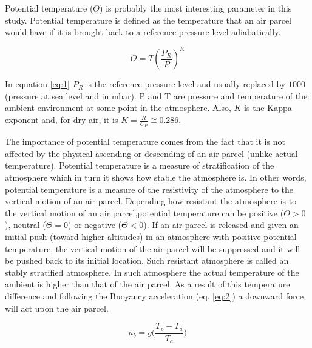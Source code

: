 \documentclass[a4paper,12pt]{article}
\numberwithin{equation}{section} %
\begin{document}
Potential temperature ($\Theta$) is probably the most interesting parameter in this study. Potential temperature is defined as the temperature that an air parcel would have if it is brought back to a reference pressure level adiabatically.

\vspace{0.5cm}

\begin{equation}\label{eq:1}
\Theta = T(\frac{P_R}{P})^K
\end{equation}

\vspace{0.5cm}

In equation \ref{eq:1} $P_R$ is the reference pressure level and usually replaced by $1000$ (pressure at sea level and in mbar). P and T are pressure and temperature of the ambient environment at some point in the atmosphere. Also, $K$ is the Kappa exponent and, for dry air, it is $K = \frac{R}{C_P}\cong 0.286$.

The importance of potential temperature comes from the fact that it is not affected by the physical ascending or descending of an air parcel (unlike actual temperature). Potential temperature is a measure of stratification of the atmosphere which in turn it shows how stable the atmosphere is. In other words, potential temperature is a measure of the resistivity of the atmosphere to the vertical motion of an air parcel. Depending how resistant the atmosphere is to the vertical motion of an air parcel,potential temperature can be positive ($\Theta > 0$), neutral ($\Theta = 0$) or negative ($\Theta < 0$). If an air parcel is released and given an initial push (toward higher altitudes) in an atmosphere with positive potential temperature, the vertical motion of the air parcel will be suppressed and it will be pushed back to its initial location. Such resistant atmosphere is called an stably stratified atmosphere. In such atmosphere the actual temperature of the ambient is higher than that of the air parcel. As a result of this temperature difference and following the Buoyancy acceleration (eq. \ref{eq:2}) a downward force will act upon the air parcel.

\vspace{0.5cm}
\begin{equation}\label{eq:2}
a_b = g\bigg(\frac{T_p - T_a}{T_a}\bigg)
\end{equation}

\vspace{0.25cm}
\end{document}
